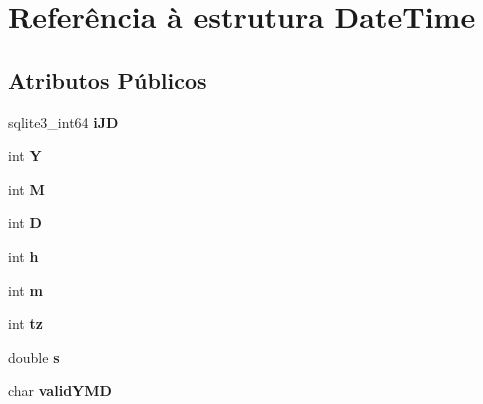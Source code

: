 \hypertarget{struct_date_time}{\section{Referência à estrutura Date\-Time}
\label{struct_date_time}
}
\subsection*{Atributos Públicos}
\begin{DoxyCompactItemize}
\item 
\hypertarget{struct_date_time_ae5043d34fa3c3c4dc1121fec886c6f10}{sqlite3\-\_\-int64 {\bfseries i\-J\-D}}\label{struct_date_time_ae5043d34fa3c3c4dc1121fec886c6f10}

\item 
\hypertarget{struct_date_time_ad39449618b2a15128e32766a208753cf}{int {\bfseries Y}}\label{struct_date_time_ad39449618b2a15128e32766a208753cf}

\item 
\hypertarget{struct_date_time_a00e6515603bb5d7c5ce79d3a5a6438a7}{int {\bfseries M}}\label{struct_date_time_a00e6515603bb5d7c5ce79d3a5a6438a7}

\item 
\hypertarget{struct_date_time_a979ec52428a05d2f2ed827345a416fa6}{int {\bfseries D}}\label{struct_date_time_a979ec52428a05d2f2ed827345a416fa6}

\item 
\hypertarget{struct_date_time_a2146547149b65f64e07e1ac6ed8654b6}{int {\bfseries h}}\label{struct_date_time_a2146547149b65f64e07e1ac6ed8654b6}

\item 
\hypertarget{struct_date_time_ac5db527c48331a515bea3b828d1a2254}{int {\bfseries m}}\label{struct_date_time_ac5db527c48331a515bea3b828d1a2254}

\item 
\hypertarget{struct_date_time_a7f5c2e587ee18014982d85eb616f09b8}{int {\bfseries tz}}\label{struct_date_time_a7f5c2e587ee18014982d85eb616f09b8}

\item 
\hypertarget{struct_date_time_a69a803afb69b74206418bda0bc1bcaa2}{double {\bfseries s}}\label{struct_date_time_a69a803afb69b74206418bda0bc1bcaa2}

\item 
\hypertarget{struct_date_time_aaa042bec0879cd922039062433f4b26f}{char {\bfseries valid\-Y\-M\-D}}\label{struct_date_time_aaa042bec0879cd922039062433f4b26f}


\end{DoxyCompactItemize}
